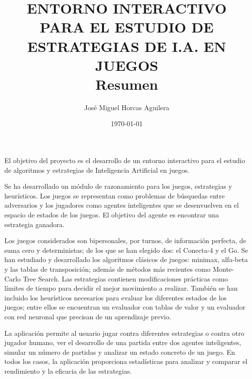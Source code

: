 \documentclass[12pt, a4paper]{article}
\title{ENTORNO INTERACTIVO PARA EL ESTUDIO DE ESTRATEGIAS DE I.A.
EN JUEGOS\\Resumen}
\author{José Miguel Horcas Aguilera}
\date{\today}
\begin{document}
	\maketitle

El objetivo del proyecto es el desarrollo de un entorno interactivo
para el estudio de algoritmos y estrategias de Inteligencia Artificial en
juegos.

Se ha desarrollado un módulo de razonamiento para los juegos, estrategias y
heurísticos.
Los juegos se representan como problemas de búsquedas entre adversarios y los
jugadores como agentes inteligentes que se desenvuelven en el espacio de estados
de los juegos.
El objetivo del agente es encontrar una estrategia ganadora.

Los juegos considerados son bipersonales, por turnos, de información perfecta,
de suma cero y deterministas; de los que se han elegido dos: el Conecta-4 y
el Go.
Se han estudiado y desarrollado los algoritmos clásicos de juegos:
minimax, alfa-beta y las tablas de transposición; además de métodos más
recientes como Monte-Carlo Tree Search.
Las estrategias contienen modificaciones prácticas como límites de tiempo para
decidir el mejor movimiento a realizar.
También se han incluido los heurísticos necesarios para evaluar los diferentes
estados de los juegos; entre ellos se encuentran un evaluador con tablas de
valor y un evaluador con red neuronal que precisan de un aprendizaje previo.

La aplicación permite al usuario jugar contra diferentes estrategias o contra
otro jugador humano, ver el desarrollo de una partida entre dos agentes
inteligentes, simular un número de partidas y analizar un estado concreto de un
juego.
En todos los casos, la aplicación proporciona estadísticas para analizar
y comparar el rendimiento y la eficacia de las estrategias.
\end{document}
